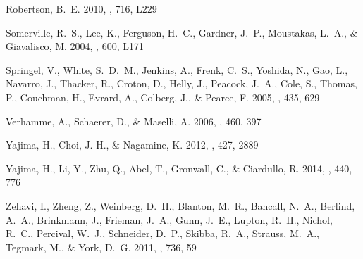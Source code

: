 \documentclass{emulateapj}
\begin{document}
\begin{thebibliography}{43}
{Robertson}, B.~E. 2010, \apjl, 716, L229

{Somerville}, R.~S., {Lee}, K., {Ferguson}, H.~C., {Gardner}, J.~P.,
  {Moustakas}, L.~A., \& {Giavalisco}, M. 2004, \apjl, 600, L171

{Springel}, V., {White}, S.~D.~M., {Jenkins}, A., {Frenk}, C.~S., {Yoshida},
  N., {Gao}, L., {Navarro}, J., {Thacker}, R., {Croton}, D., {Helly}, J.,
  {Peacock}, J.~A., {Cole}, S., {Thomas}, P., {Couchman}, H., {Evrard}, A.,
  {Colberg}, J., \& {Pearce}, F. 2005, \nat, 435, 629

{Verhamme}, A., {Schaerer}, D., \& {Maselli}, A. 2006, \aap, 460, 397

{Yajima}, H., {Choi}, J.-H., \& {Nagamine}, K. 2012, \mnras, 427, 2889

{Yajima}, H., {Li}, Y., {Zhu}, Q., {Abel}, T., {Gronwall}, C., \& {Ciardullo},
  R. 2014, \mnras, 440, 776

{Zehavi}, I., {Zheng}, Z., {Weinberg}, D.~H., {Blanton}, M.~R., {Bahcall},
  N.~A., {Berlind}, A.~A., {Brinkmann}, J., {Frieman}, J.~A., {Gunn}, J.~E.,
  {Lupton}, R.~H., {Nichol}, R.~C., {Percival}, W.~J., {Schneider}, D.~P.,
  {Skibba}, R.~A., {Strauss}, M.~A., {Tegmark}, M., \& {York}, D.~G. 2011,
  \apj, 736, 59

\end{thebibliography}
\end{document}
